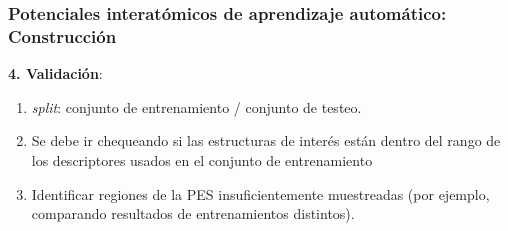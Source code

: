 \documentclass[aspectratio=169]{beamer}
\let\oldtextbf\textbf
\renewcommand{\textbf}[1]{\textcolor{nordblue}{\oldtextbf{#1}}}
\begin{document}
    \begin{frame}
        \frametitle{Potenciales interatómicos de aprendizaje automático: Construcción}

        \textbf{4. Validación}:
        \begin{enumerate}
            \item \textit{split}: conjunto de entrenamiento / conjunto de testeo.
            \item Se debe ir chequeando si las estructuras de interés están dentro
                del rango de los descriptores usados en el conjunto de 
                entrenamiento
            \item Identificar regiones de la PES insuficientemente muestreadas 
                (por ejemplo, comparando resultados de entrenamientos distintos).
        \end{enumerate}

	\end{frame}
\end{document}
